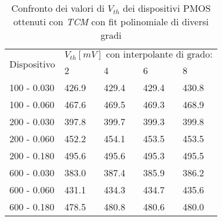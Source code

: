 \begin{table}[h]
  \renewcommand{\arraystretch}{1.3}
  \centering
  \begin{tabular}{m{2.1cm} m{2cm} m{2cm} m{2cm} m{2cm}}
    \toprule
    \multirow{2}{*}{Dispositivo} & \multicolumn{4}{c}{$V_{th} [mV] \text{ con interpolante di grado:}$}                         \\
    \cmidrule{2-5}
                                 & 2                                                                    & 4     & 6     & 8     \\
    \midrule
    100 - 0.030                  & 426.9                                                                & 429.4 & 429.4 & 430.8 \\
    \hline
    100 - 0.060                  & 467.6                                                                & 469.5 & 469.3 & 468.9 \\
    \hline
    200 - 0.030                  & 397.8                                                                & 399.7 & 399.3 & 399.8 \\
    \hline
    200 - 0.060                  & 452.2                                                                & 454.1 & 453.5 & 453.5 \\
    \hline
    200 - 0.180                  & 495.6                                                                & 495.6 & 495.3 & 495.5 \\
    \hline
    600 - 0.030                  & 383.0                                                                & 387.4 & 385.9 & 386.2 \\
    \hline
    600 - 0.060                  & 431.1                                                                & 434.3 & 434.7 & 435.6 \\
    \hline
    600 - 0.180                  & 478.5                                                                & 480.8 & 480.6 & 480.0 \\

    \bottomrule
  \end{tabular}
  \caption{Confronto dei valori di $V_{th}$ dei dispositivi PMOS ottenuti con \emph{TCM} con fit polinomiale di diversi gradi}
  \label{tab:GradiTCM}
\end{table}


